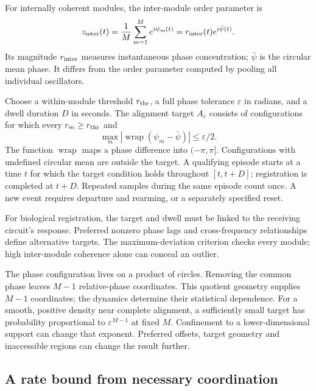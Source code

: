 \documentclass[11pt]{article}
\newcommand{\wrap}{\operatorname{wrap}}
\begin{document}
For internally coherent modules, the inter-module order parameter is
\begin{equation}
 z_{\rm inter}(t)=\frac{1}{M}\sum_{m=1}^{M}e^{i\psi_m(t)}
                =r_{\rm inter}(t)e^{i\bar\psi(t)}.
 \label{eq:inter}
\end{equation}
Its magnitude $r_{\rm inter}$ measures instantaneous phase concentration;
$\bar\psi$ is the circular mean phase. It differs from the order parameter
computed by pooling all individual oscillators.

Choose a within-module threshold $r_{\rm thr}$, a full phase tolerance
$\varepsilon$ in radians, and a dwell duration $D$ in seconds. The
alignment target $A_\varepsilon$ consists of configurations for which every
$r_m\geq r_{\rm thr}$ and
\begin{equation}
 \max_m |\wrap(\psi_m-\bar\psi)|\leq\varepsilon/2.
 \label{eq:target}
\end{equation}
The function $\wrap$ maps a phase difference into $(-\pi,\pi]$.
Configurations with undefined circular mean are outside the target.
A qualifying episode starts at a time $t$ for which the target condition
holds throughout $[t,t+D]$; registration is completed at $t+D$.
Repeated samples during the same episode count once. A new event requires
departure and rearming, or a separately specified reset.

For biological registration, the target and dwell must be linked to the
receiving circuit's response. Preferred nonzero phase lags and
cross-frequency relationships define alternative targets. The
maximum-deviation criterion checks every module; high inter-module
coherence alone can conceal an outlier.

The phase configuration lives on a product of circles. Removing the
common phase leaves $M-1$ relative-phase coordinates. This quotient
geometry supplies $M-1$ coordinates; the dynamics determine their
statistical dependence. For a smooth,
positive density near complete alignment, a sufficiently small target
has probability proportional to $\varepsilon^{M-1}$ at fixed $M$.
Confinement to a lower-dimensional support can change that exponent.
Preferred offsets, target geometry and inaccessible regions can change
the result further.

\subsection{A rate bound from necessary coordination}
\label{sec:rate}
\end{document}
